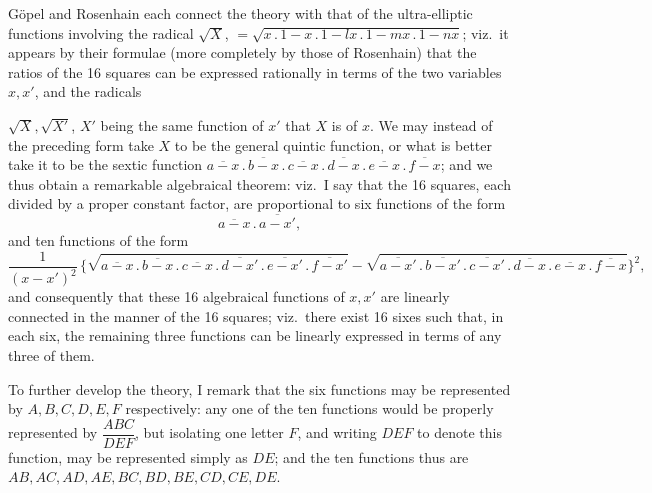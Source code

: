 \documentclass[11pt,a4paper]{article}
\begin{document}
\medskip

G\"opel and Rosenhain each connect the theory with that of the ultra-elliptic functions involving the radical $\sqrt{X}$, $= \sqrt{x\,.\,1 - x\,.\,1 - lx\,.\,1 - mx\,.\,1 - nx}$; viz.\ it appears by their formulae (more completely by those of Rosenhain) that the ratios of the 16 squares can be expressed rationally in terms of the two variables $x, x'$, and the radicals

\newpage


\noindent $\sqrt{X}, \sqrt{X'}$, $X'$ being the same function of $x'$ that $X$ is of $x$. We may instead of the preceding form take $X$ to be the general quintic function, or what is better take it to be the sextic function $\overline{a - x}\,.\,\overline{b - x}\,.\,\overline{c - x}\,.\,\overline{d - x}\,.\,\overline{e - x}\,.\,\overline{f - x}$; and we thus obtain a remarkable algebraical theorem: viz.\ I say that the 16 squares, each divided by a proper constant factor, are proportional to six functions of the form
\[
\overline{a - x}\,.\,\overline{a - x'},
\]
and ten functions of the form
\[
\frac{1}{(x - x')^{2}}\,\{\sqrt{\overline{a - x}\,.\,\overline{b - x}\,.\,\overline{c - x}\,.\,\overline{d - x'}\,.\,\overline{e - x'}\,.\,\overline{f - x'}} - \sqrt{\overline{a - x'}\,.\,\overline{b - x'}\,.\,\overline{c - x'}\,.\,\overline{d - x}\,.\,\overline{e - x}\,.\,\overline{f - x}}\}^{2},
\]
and consequently that these 16 algebraical functions of $x, x'$ are linearly connected in the manner of the 16 squares; viz.\ there exist 16 sixes such that, in each six, the remaining three functions can be linearly expressed in terms of any three of them.

\medskip

To further develop the theory, I remark that the six functions may be represented by $A, B, C, D, E, F$ respectively: any one of the ten functions would be properly represented by $\dfrac{ABC}{DEF}$, but isolating one letter $F$, and writing $DEF$ to denote this function, may be represented simply as $DE$; and the ten functions thus are $AB, AC, AD, AE, BC, BD, BE, CD, CE, DE$.

\medskip
\end{document}
